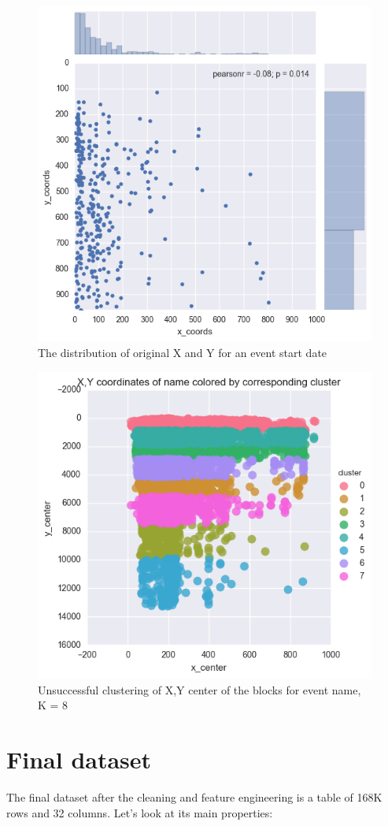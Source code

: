 \begin{figure}[h]
\begin{center}
\includegraphics[width=.6\textwidth]{figures07/startDateXY}
\caption{The distribution of original X and Y for an event start date}
\label{fig:startDateXY}
\end{center}
\end{figure}


\begin{figure}[h]
\begin{center}
\includegraphics[width=.6\textwidth]{figures07/nameXYCluster8}
\caption{Unsuccessful clustering of X,Y center of the blocks for event name, K = 8}
\label{fig:nameXYCluster8}
\end{center}
\end{figure}    

\section{Final dataset}
The final dataset after the cleaning and feature engineering is a table of 168K rows and 32 columns. Let's look at its main properties: 

